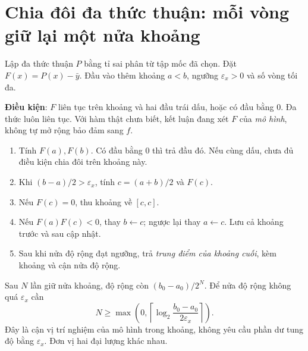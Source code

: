 \section{Chia đôi đa thức thuận: mỗi vòng giữ lại một nửa khoảng}
\label{sec:inverse-bisection}
Lập đa thức thuận $P$ bằng tỉ sai phân từ tập mốc đã chọn. Đặt $F(x)=P(x)-\bar y$. Đầu vào thêm khoảng $a<b$, ngưỡng $\varepsilon_x>0$ và số vòng tối đa.

\textbf{Điều kiện}: $F$ liên tục trên khoảng và hai đầu trái dấu, hoặc có đầu bằng 0. Đa thức luôn liên tục. Với hàm thật chưa biết, kết luận đang xét $F$ của \emph{mô hình}, không tự mở rộng bảo đảm sang $f$.
\begin{enumerate}
\item Tính $F(a),F(b)$. Có đầu bằng 0 thì trả đầu đó. Nếu cùng dấu, chưa đủ điều kiện chia đôi trên khoảng này.
\item Khi $(b-a)/2>\varepsilon_x$, tính $c=(a+b)/2$ và $F(c)$.
\item Nếu $F(c)=0$, thu khoảng về $[c,c]$.
\item Nếu $F(a)F(c)<0$, thay $b\leftarrow c$; ngược lại thay $a\leftarrow c$. Lưu cả khoảng trước và sau cập nhật.
\item Sau khi nửa độ rộng đạt ngưỡng, trả \emph{trung điểm của khoảng cuối}, kèm khoảng và cận nửa độ rộng.
\end{enumerate}
Sau $N$ lần giữ nửa khoảng, độ rộng còn $(b_0-a_0)/2^N$. Để nửa độ rộng không quá $\varepsilon_x$ cần
\[
 N\ge\max\left(0,\left\lceil\log_2\frac{b_0-a_0}{2\varepsilon_x}\right\rceil\right).
\]
Đây là cận vị trí nghiệm của mô hình trong khoảng, không yêu cầu phần dư tung độ bằng $\varepsilon_x$. Đơn vị hai đại lượng khác nhau.

